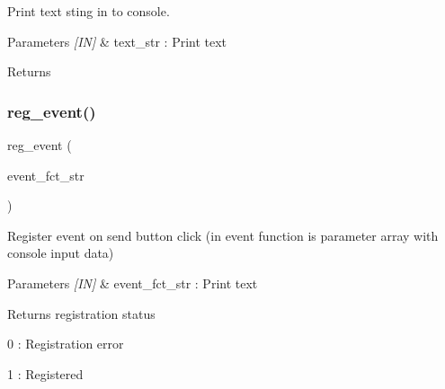 Print text sting in to console. 


\begin{DoxyCode}{0}
\end{DoxyCode}



\begin{DoxyParams}{Parameters}
{\em \mbox{[}\+I\+N\mbox{]}} & text\+\_\+str \+: Print text \\
\hline
\end{DoxyParams}
\begin{DoxyReturn}{Returns}

\end{DoxyReturn}
\mbox{\label{classmain__frame_a182485bf94b7e6b5b3f0da6935ef40b1}} 
\subsubsection{reg\_event()}
{\footnotesize\ttfamily reg\+\_\+event (\begin{DoxyParamCaption}\item[{event\+\_\+fct\+\_\+str}]{ }\end{DoxyParamCaption})}



Register event on send button click (in event function is parameter array with console input data) 


\begin{DoxyCode}{0}
\DoxyCodeLine{\{}
\DoxyCodeLine{\}}
\end{DoxyCode}



\begin{DoxyParams}{Parameters}
{\em \mbox{[}\+I\+N\mbox{]}} & event\+\_\+fct\+\_\+str \+: Print text \\
\hline
\end{DoxyParams}
\begin{DoxyReturn}{Returns}
registration status \begin{DoxyItemize}
\item 0 \+: Registration error \item 1 \+: Registered \end{DoxyItemize}

\end{DoxyReturn}
\mbox{\label{classmain__frame_aa7e74abc2c1d1874144fe30c711112ef}} 
